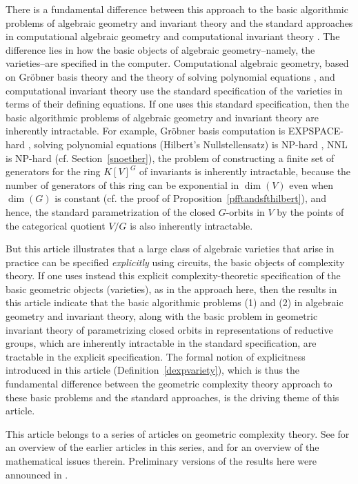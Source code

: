\documentclass[11pt]{article}
\begin{document}
There is  a fundamental  difference
between this  approach to the basic algorithmic problems of    algebraic geometry and invariant theory
and the standard approaches 
in  computational algebraic geometry \cite{mayr2} and  computational  invariant theory \cite{derksenbook}.
The difference lies in how the
basic objects of algebraic geometry--namely, the varieties--are specified in the computer. 
Computational algebraic geometry, based  on  Gr\"obner basis theory \cite{mayr2} and the theory of
solving polynomial equations \cite{kollar,koiran}, and  computational invariant theory \cite{popov,derksenbook} 
use the standard specification of the varieties  in terms of 
their defining equations. If one uses this standard specification, then 
the basic algorithmic problems of  algebraic  geometry and invariant theory are inherently intractable. For example,
Gr\"obner basis computation is EXPSPACE-hard \cite{mayr2},  solving
polynomial equations (Hilbert's Nullstellensatz) is NP-hard \cite{portier},
NNL is NP-hard (cf. Section~\ref{snoether}), 
the problem of constructing a finite set of generators for the ring $K[V]^G$ of  invariants  is inherently intractable,
because  the number of generators of  this  ring can be exponential in $\dim(V)$ even
when $\dim(G)$ is constant (cf. the proof of Proposition~\ref{pfftandsfthilbert}),
and hence, the standard \cite{mumford}  parametrization of the closed $G$-orbits in $V$ 
by the points of the categorical quotient $V/G$ is also inherently intractable.

But this article illustrates that a large class of algebraic varieties that arise in practice 
can be specified  {\em explicitly} using circuits, the basic objects of complexity theory. If 
one uses instead this    explicit complexity-theoretic specification of the basic geometric objects (varieties), 
as in the  approach  here,  then the results in this article indicate that the basic algorithmic problems 
(1) and (2) in algebraic geometry and invariant theory, along with the basic problem in geometric invariant theory
\cite{mumford} of parametrizing closed orbits in representations
of reductive groups,
which  are inherently intractable in the standard specification, are 
tractable in the explicit specification. The formal notion of explicitness introduced in this article 
(Definition~\ref{dexpvariety}), which is thus the
fundamental  difference between the geometric complexity theory approach to these basic problems and the 
standard approaches, is the driving theme of this article.


This article belongs to a series \cite{GCT1,GCT2,GCT3,GCT4}  of articles on
geometric complexity theory. 
See \cite{GCTcacm, GCTjacm} for an overview  of the earlier articles in this series,
and \cite{manivel} for an overview of the mathematical issues therein.
Preliminary versions of the results here were announced  in \cite{GCT5focs}.
\end{document}
